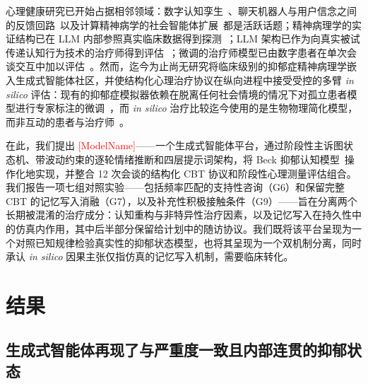 \documentclass[11pt,a4paper]{article}
\newcommand{\ph}[1]{\textcolor{red}{[#1]}}
\begin{document}
心理健康研究已开始占据相邻领域：数字认知孪生~\cite{doraiswamy2025}、聊天机器人与用户信念之间的反馈回路~\cite{dohany2026}以及计算精神病学的社会智能体扩展~\cite{rhoads2024}都是活跃话题；精神病理学的实证结构已在 LLM 内部参照真实临床数据得到探测~\cite{kambeitz2025nmh}；LLM 架构已作为向真实被试传递认知行为技术的治疗师得到评估~\cite{rollwage2026}；微调的治疗师模型已由数字患者在单次会谈交互中加以评估~\cite{yosef2025}。然而，迄今为止尚无研究将临床级别的抑郁症精神病理学嵌入生成式智能体社区，并使结构化心理治疗协议在纵向进程中接受受控的多臂 \emph{in silico} 评估：现有的抑郁症模拟器依赖在脱离任何社会情境的情况下对孤立患者模型进行专家标注的微调~\cite{liu2025}，而 \emph{in silico} 治疗比较迄今使用的是生物物理简化模型，而非互动的患者与治疗师~\cite{montague2012,hauser2022,deco2024}。

在此，我们提出 \ph{ModelName}——一个生成式智能体平台，通过阶段性主诉图状态机、带波动约束的逐轮情绪推断和四层提示词架构，将 Beck 抑郁认知模型~\cite{beck1967}操作化地实现，并整合 12 次会谈的结构化 CBT 协议和阶段性心理测量评估组合。我们报告一项七组对照实验——包括频率匹配的支持性咨询（G6）和保留完整 CBT 的记忆写入消融（G7），以及补充性积极接触条件（G9）——旨在分离两个长期被混淆的治疗成分：认知重构与非特异性治疗因素，以及记忆写入在持久性中的仿真内作用，其中后半部分保留给计划中的随访协议。我们既将该平台呈现为一个对照已知规律检验真实性的抑郁状态模型，也将其呈现为一个双机制分离，同时承认 \emph{in silico} 因果主张仅指仿真的记忆写入机制，需要临床转化。

\section{结果}\label{sec:results}

\subsection*{生成式智能体再现了与严重度一致且内部连贯的抑郁状态}
\end{document}
